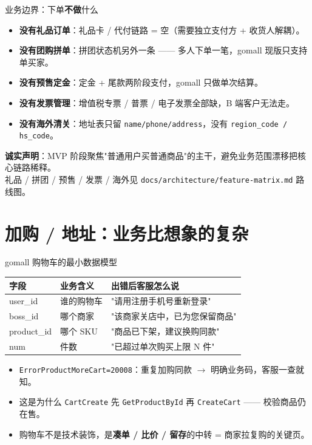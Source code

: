 \documentclass[aspectratio=169,11pt]{beamer}
\begin{document}
\begin{frame}[shrink]{业务边界：下单\textbf{不做}什么}
\begin{itemize}
  \item \textbf{没有礼品订单}：礼品卡 / 代付链路 = 空（需要独立支付方 + 收货人解耦）。
  \item \textbf{没有团购拼单}：拼团状态机另外一条 —— 多人下单一笔，gomall 现版只支持单买家。
  \item \textbf{没有预售定金}：定金 + 尾款两阶段支付，gomall 只做单次结算。
  \item \textbf{没有发票管理}：增值税专票 / 普票 / 电子发票全部缺，B 端客户无法走。
  \item \textbf{没有海外清关}：地址表只留 \texttt{name/phone/address}，没有 \texttt{region\_code / hs\_code}。
\end{itemize}
\vspace{2mm}
\small \textbf{诚实声明}：MVP 阶段聚焦"普通用户买普通商品"的主干，避免业务范围漂移把核心链路稀释。\\
礼品 / 拼团 / 预售 / 发票 / 海外见 \texttt{docs/architecture/feature-matrix.md} 路线图。
\end{frame}

\section{加购 / 地址：业务比想象的复杂}

\begin{frame}[shrink]{gomall 购物车的最小数据模型}
\begin{tabular}{@{}lll@{}}
\toprule
字段 & 业务含义 & 出错后客服怎么说 \\
\midrule
user\_id    & 谁的购物车  & "请用注册手机号重新登录" \\
boss\_id    & 哪个商家   & "该商家关店中，已为您保留商品" \\
product\_id & 哪个 SKU   & "商品已下架，建议换购同款" \\
num         & 件数      & "已超过单次购买上限 N 件" \\
\bottomrule
\end{tabular}
\vspace{2mm}
\begin{itemize}
  \item \texttt{ErrorProductMoreCart=20008}：重复加购同款 $\to$ 明确业务码，客服一查就知。
  \item 这是为什么 \texttt{CartCreate} 先 \texttt{GetProductById} 再 \texttt{CreateCart} —— 校验商品仍在售。
  \item 购物车不是技术装饰，是\textbf{凑单 / 比价 / 留存}的中转 = 商家拉复购的关键页。
\end{itemize}
\end{frame}
\end{document}
